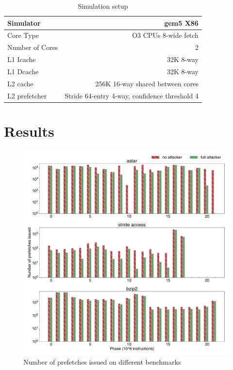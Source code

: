 \documentclass[conference]{IEEEtran}
\begin{document}
\begin{table}[hbp]
\centering
\caption{Simulation setup}
\label{tab:simulation_setup}
\begin{tabular}{|l|r|}
    \hline
    Simulator  & gem5 X86\\
    \hline
    Core Type  & O3 CPUs 8-wide fetch\\
    \hline
    Number of Cores & 2\\
    \hline
    L1 Icache & 32K 8-way\\
    \hline
    L1 Dcache & 32K 8-way\\
    \hline
    L2 cache & 256K 16-way shared between cores\\
    \hline
    L2 prefetcher  & Stride 64-entry 4-way, confidence threshold 4\\
    \hline
\end{tabular}
\end{table}

\section{Results} \label{sec:results}

\begin{figure}[htbp]
    \centering
    \includegraphics[width=\columnwidth]{hwpf_num}
    \caption{Number of prefetches issued on different benchmarks}
    \label{fig:prefetch_attack}
\end{figure}
\end{document}
